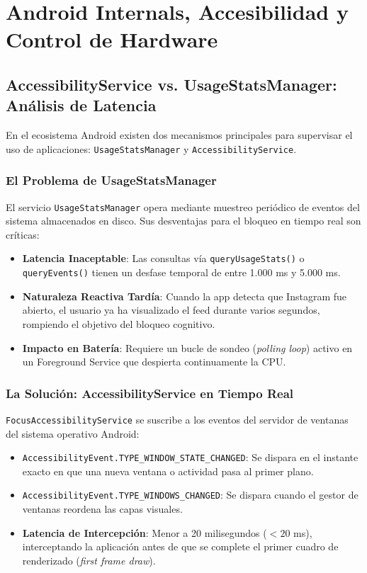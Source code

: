 \documentclass[11pt,a4paper,oneside]{report}
\begin{document}
\newpage

\chapter[Android Internals y Hardware]{Android Internals, Accesibilidad y Control de Hardware}

\section{AccessibilityService vs. UsageStatsManager: Análisis de Latencia}
En el ecosistema Android existen dos mecanismos principales para supervisar el uso de aplicaciones: \texttt{UsageStatsManager} y \texttt{AccessibilityService}.

\subsection{El Problema de UsageStatsManager}
El servicio \texttt{UsageStatsManager} opera mediante muestreo periódico de eventos del sistema almacenados en disco. Sus desventajas para el bloqueo en tiempo real son críticas:
\begin{itemize}
    \item \textbf{Latencia Inaceptable}: Las consultas vía \texttt{queryUsageStats()} o \texttt{queryEvents()} tienen un desfase temporal de entre 1.000 ms y 5.000 ms.
    \item \textbf{Naturaleza Reactiva Tardía}: Cuando la app detecta que Instagram fue abierto, el usuario ya ha visualizado el feed durante varios segundos, rompiendo el objetivo del bloqueo cognitivo.
    \item \textbf{Impacto en Batería}: Requiere un bucle de sondeo (\textit{polling loop}) activo en un Foreground Service que despierta continuamente la CPU.
\end{itemize}

\subsection{La Solución: AccessibilityService en Tiempo Real}
\texttt{FocusAccessibilityService} se suscribe a los eventos del servidor de ventanas del sistema operativo Android:
\begin{itemize}
    \item \texttt{AccessibilityEvent.TYPE\_WINDOW\_STATE\_CHANGED}: Se dispara en el instante exacto en que una nueva ventana o actividad pasa al primer plano.
    \item \texttt{AccessibilityEvent.TYPE\_WINDOWS\_CHANGED}: Se dispara cuando el gestor de ventanas reordena las capas visuales.
    \item \textbf{Latencia de Intercepción}: Menor a 20 milisegundos ($<20$ ms), interceptando la aplicación antes de que se complete el primer cuadro de renderizado (\textit{first frame draw}).
\end{itemize}
\end{document}
